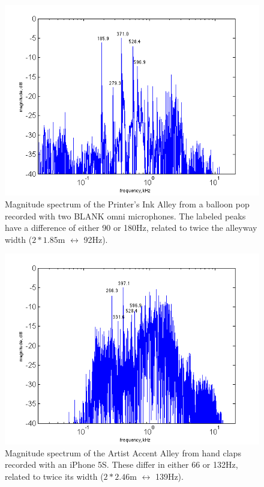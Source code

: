 \documentclass{aes137}
\begin{document}
\begin{figure}[h!] \centering \includegraphics[width=\linewidth]{images/printers_labeled_IR.png} 
\caption{Magnitude spectrum of the Printer's Ink Alley from
  a balloon pop recorded with two BLANK omni microphones. The labeled
  peaks have a difference of either 90 or 180Hz, related to twice the alleyway width
  ($2*1.85$m $\longleftrightarrow$ 92Hz).}
\end{figure}

\begin{figure}[h!] \centering \includegraphics[width=\linewidth]{images/artists_labeled_IR.png} 
\caption{Magnitude spectrum of the Artist Accent Alley from hand claps
  recorded with an iPhone 5S. These differ in either 66 or 132Hz,
  related to twice its width ($2*2.46$m $\longleftrightarrow$ 139Hz).}
\end{figure}
\end{document}
